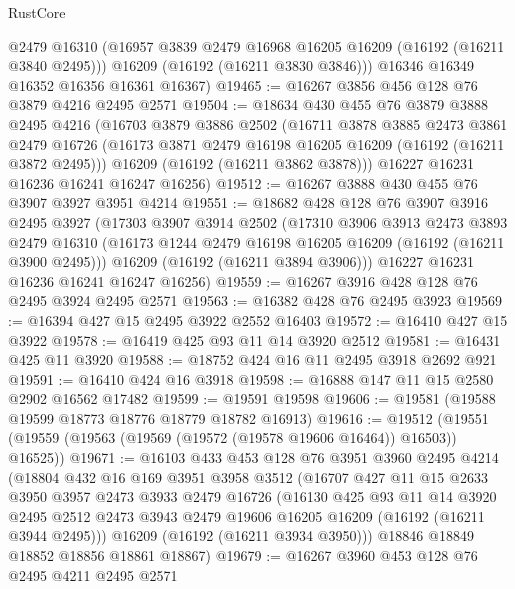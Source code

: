 \begin{lexlean}{RustCore}
\begin{coremodule}
        @2479
        @16310
        (@16957 @3839 @2479 @16968 @16205 @16209 (@16192 (@16211 @3840 @2495)))
        @16209
        (@16192 (@16211 @3830 @3846)))
      @16346
      @16349
      @16352
      @16356
      @16361
      @16367)
@19465 := @16267 @3856 @456 @128 @76 @3879 @4216 @2495 @2571
@19504 := @18634
    @430
    @455
    @76
    @3879
    @3888
    @2495
    @4216
    (@16703
      @3879
      @3886
      @2502
      (@16711
        @3878
        @3885
        @2473
        @3861
        @2479
        @16726
        (@16173 @3871 @2479 @16198 @16205 @16209 (@16192 (@16211 @3872 @2495)))
        @16209
        (@16192 (@16211 @3862 @3878)))
      @16227
      @16231
      @16236
      @16241
      @16247
      @16256)
@19512 := @16267 @3888 @430 @455 @76 @3907 @3927 @3951 @4214
@19551 := @18682
    @428
    @128
    @76
    @3907
    @3916
    @2495
    @3927
    (@17303
      @3907
      @3914
      @2502
      (@17310
        @3906
        @3913
        @2473
        @3893
        @2479
        @16310
        (@16173 @1244 @2479 @16198 @16205 @16209 (@16192 (@16211 @3900 @2495)))
        @16209
        (@16192 (@16211 @3894 @3906)))
      @16227
      @16231
      @16236
      @16241
      @16247
      @16256)
@19559 := @16267 @3916 @428 @128 @76 @2495 @3924 @2495 @2571
@19563 := @16382 @428 @76 @2495 @3923
@19569 := @16394 @427 @15 @2495 @3922 @2552 @16403
@19572 := @16410 @427 @15 @3922
@19578 := @16419 @425 @93 @11 @14 @3920 @2512
@19581 := @16431 @425 @11 @3920
@19588 := @18752 @424 @16 @11 @2495 @3918 @2692 @921
@19591 := @16410 @424 @16 @3918
@19598 := @16888 @147 @11 @15 @2580 @2902 @16562 @17482
@19599 := @19591 @19598
@19606 := @19581 (@19588 @19599 @18773 @18776 @18779 @18782 @16913)
@19616 := @19512 (@19551 (@19559 (@19563 (@19569 (@19572 (@19578 @19606 @16464)) @16503)) @16525))
@19671 := @16103
    @433
    @453
    @128
    @76
    @3951
    @3960
    @2495
    @4214
    (@18804
      @432
      @16
      @169
      @3951
      @3958
      @3512
      (@16707
        @427
        @11
        @15
        @2633
        @3950
        @3957
        @2473
        @3933
        @2479
        @16726
        (@16130
          @425
          @93
          @11
          @14
          @3920
          @2495
          @2512
          @2473
          @3943
          @2479
          @19606
          @16205
          @16209
          (@16192 (@16211 @3944 @2495)))
        @16209
        (@16192 (@16211 @3934 @3950)))
      @18846
      @18849
      @18852
      @18856
      @18861
      @18867)
@19679 := @16267 @3960 @453 @128 @76 @2495 @4211 @2495 @2571

\end{coremodule}
\end{lexlean}
